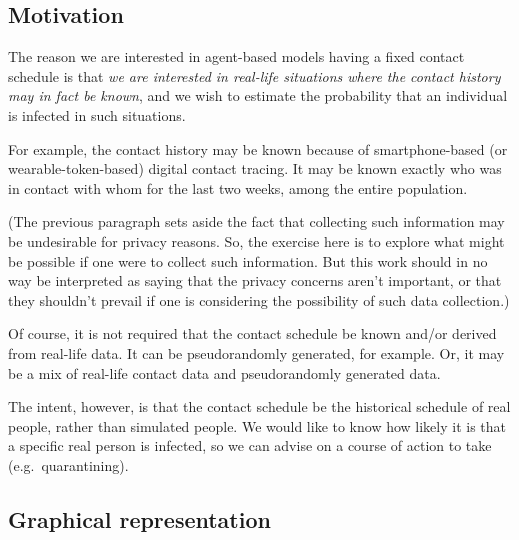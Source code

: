 \documentclass[11pt]{article}
\begin{document}
    \hypertarget{motivation}{%
\subsection{Motivation}\label{motivation}}

The reason we are interested in agent-based models having a fixed
contact schedule is that \emph{we are interested in real-life situations
where the contact history may in fact be known}, and we wish to estimate
the probability that an individual is infected in such situations.

For example, the contact history may be known because of
smartphone-based (or wearable-token-based) digital contact tracing. It
may be known exactly who was in contact with whom for the last two
weeks, among the entire population.

(The previous paragraph sets aside the fact that collecting such
information may be undesirable for privacy reasons. So, the exercise
here is to explore what might be possible if one were to collect such
information. But this work should in no way be interpreted as saying
that the privacy concerns aren't important, or that they shouldn't
prevail if one is considering the possibility of such data collection.)

Of course, it is not required that the contact schedule be known and/or
derived from real-life data. It can be pseudorandomly generated, for
example. Or, it may be a mix of real-life contact data and
pseudorandomly generated data.

The intent, however, is that the contact schedule be the historical
schedule of real people, rather than simulated people. We would like to
know how likely it is that a specific real person is infected, so we can
advise on a course of action to take (e.g.~quarantining).

    \hypertarget{graphical-representation}{%
\subsection{Graphical representation}\label{graphical-representation}}
\end{document}
